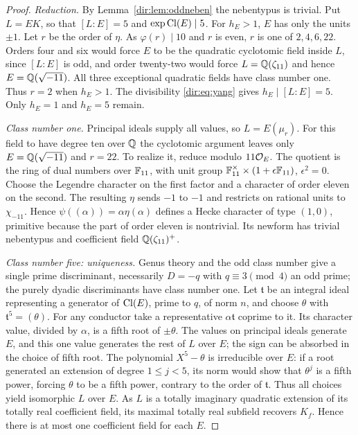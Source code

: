 \begin{proof}
\emph{Reduction.} By Lemma~\ref{dir:lem:oddneben} the nebentypus is trivial. Put $L=EK$, so
that $[L:E]=5$ and $\exp\operatorname{Cl}(E)\mid5$. For $h_E>1$, $E$ has only the units $\pm1$. Let
$r$ be the order of $\eta$. As $\varphi(r)\mid10$ and $r$ is even, $r$ is one of
$2,4,6,22$. Orders four and six would force $E$ to be the quadratic cyclotomic field
inside $L$, since $[L:E]$ is odd, and order twenty-two would force $L=\mathbb{Q}(\zeta_{11})$
and hence $E=\mathbb{Q}(\sqrt{-11})$. All three exceptional quadratic fields have class number
one. Thus $r=2$ when $h_E>1$. The divisibility \eqref{dir:eq:yang} gives
$h_E\mid[L:E]=5$. Only $h_E=1$ and $h_E=5$ remain.

\emph{Class number one.} Principal ideals supply all values, so $L=E(\mu_r)$. For this
field to have degree ten over $\mathbb{Q}$ the cyclotomic argument leaves only
$E=\mathbb{Q}(\sqrt{-11})$ and $r=22$. To realize it, reduce modulo $11\mathcal{O}_E$. The quotient is
the ring of dual numbers over $\mathbb{F}_{11}$, with unit group
$\mathbb{F}_{11}^\times\times(1+\epsilon\mathbb{F}_{11})$, $\epsilon^2=0$. Choose the Legendre
character on the first factor and a character of order eleven on the second. The
resulting $\eta$ sends $-1$ to $-1$ and restricts on rational units to $\chi_{-11}$.
Hence $\psi((\alpha))=\alpha\eta(\alpha)$ defines a Hecke character of type $(1,0)$,
primitive because the part of order eleven is nontrivial. Its newform has trivial
nebentypus and coefficient field $\mathbb{Q}(\zeta_{11})^+$.

\emph{Class number five: uniqueness.} Genus theory and the odd class number give a
single prime discriminant, necessarily $D=-q$ with $q\equiv3\pmod4$ an odd prime; the
purely dyadic discriminants have class number one. Let $\mathfrak t$ be an integral
ideal representing a generator of $\operatorname{Cl}(E)$, prime to $q$, of norm $n$, and choose
$\theta$ with $\mathfrak t^5=(\theta)$. For any conductor take a representative
$\alpha\mathfrak t$ coprime to it. Its character value, divided by $\alpha$, is a
fifth root of $\pm\theta$. The values on principal ideals generate $E$, and this one
value generates the rest of $L$ over $E$; the sign can be absorbed in the choice of
fifth root. The polynomial $X^5-\theta$ is irreducible over $E$: if a root generated
an extension of degree $1\le j<5$, its norm would show that $\theta^j$ is a fifth
power, forcing $\theta$ to be a fifth power, contrary to the order of $\mathfrak t$.
Thus all choices yield isomorphic $L$ over $E$. As $L$ is a totally imaginary quadratic
extension of its totally real coefficient field, its maximal totally real subfield
recovers $K_f$. Hence there is at most one coefficient field for each $E$.


\end{proof}

